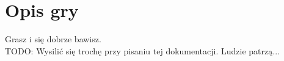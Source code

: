 \chapter{Opis gry}
Grasz i się dobrze bawisz. \\
TODO: Wysilić się trochę przy pisaniu tej dokumentacji. Ludzie patrzą...
